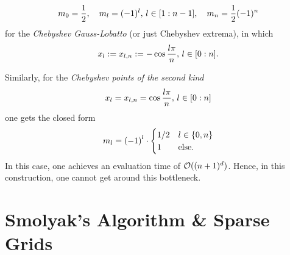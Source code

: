 \documentclass[12pt, oneside]{amsart}
\theoremstyle{definition}
\theoremstyle{remark}
\numberwithin{equation}{section}
\begin{document}
\begin{equation}\label{barycentric_weights_chebyshev}
    m_{0} = \frac{1}{2},\quad m_{l} = (-1)^l,\, l \in \indexset[1]{n-1},\quad m_n = \frac{1}{2}(-1)^n
\end{equation}
for the \emph{Chebyshev Gauss-Lobatto} (or just Chebyshev extrema), in which \begin{equation}\label{ChebyshevGaussLobatto}
    x_l \defn x_{l,n} \defn - \cos\frac{l \pi}{n},\, l \in \indexset[0]{n}.
\end{equation}

Similarly, for the \emph{Chebyshev points of the second kind}
\begin{equation}\label{eq:chebyPts2}
    x_l = x_{l, n} = \cos \frac{l \pi}{n},\, l \in \indexset[0]{n}
\end{equation}
one gets the closed form
\begin{equation}\label{eq:weightsChebyshev}
    m_l = {\left(-1\right)}^l \cdot \begin{cases}
        1/2 &l \in \set{0, n}\\
        1 &\text{else.}
    \end{cases}
\end{equation}
In this case, one achieves an evaluation time of \(\cO((n+1)^d)\).
Hence, in this construction, one cannot get around this bottleneck.


\section{Smolyak's Algorithm \& Sparse Grids}
\end{document}
